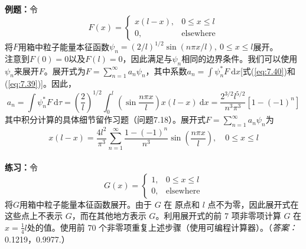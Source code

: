     \begin{examplebox}
        \textbf{例题：}令
        \begin{equation*}
            F\left(x\right) = \begin{cases}
                x\left(l-x\right), & 0 \leq x \leq l \\
                0, & \text{elsewhere}
            \end{cases}
        \end{equation*}
        将$F$用箱中粒子能量本征函数$\psi_n = \left(2/l\right)^{1/2}\sin\left(n\pi x/l\right), \: 0 \leq x \leq l$展开。
        \\
        
        注意到$F\left(0\right) = 0$以及$F\left(l\right) = 0$，因此满足与$\psi_n$相同的边界条件。我们可以使用$\psi_n$来展开$F$。展开式为$F = \sum_{n=1}^{\infty} a_n \psi_n$，其中系数$a_n = \int\psi_n^{\ast} F \:\mathrm{d}x$[式(\ref{eq:7.40})和(\ref{eq:7.39})]。因此，
        \begin{equation*}
            a_n = \int \psi_{n}^{\ast}F \:\mathrm{d}\tau = \left(\frac{2}{l}\right)^{1/2} \int_{0}^{l} \left(\sin\frac{n\pi x}{l}\right) x\left(l-x\right) \:\mathrm{d}x = \frac{2^{3/2}l^{5/2}}{n^3\pi^3}\left[1-\left(-1\right)^n\right]
        \end{equation*}
        其中积分计算的具体细节留作习题（问题7.18）。展开式$F = \sum_{n=1}^{\infty} a_n \psi_n$为
        \begin{equation*}
            x\left(l-x\right) = \frac{4l^2}{\pi^3}\sum_{n=1}^{\infty} \frac{1-\left(-1\right)^n}{n^3}\sin\left(\frac{n\pi x}{l}\right), \quad 0 \leq x \leq l
        \end{equation*}
        \\

        \textbf{练习：}令
        \begin{equation*}
            G\left(x\right) = \begin{cases}
                1, & 0 \leq x \leq l \\
                0, & \text{elsewhere}
            \end{cases}
        \end{equation*}
        将$G$用箱中粒子能量本征函数展开。由于 $G$ 在 原点和 $l$ 点不为零，因此展开式在这些点上不表示 $G$，而在其他地方表示 $G$。利用展开式的前 7 项非零项计算 $G$ 在$x = \frac{1}{4}l$处的值。使用前 70 个非零项重复上述步骤（使用可编程计算器）。（\textit{答案：}0.1219，0.9977.）
    \end{examplebox}

